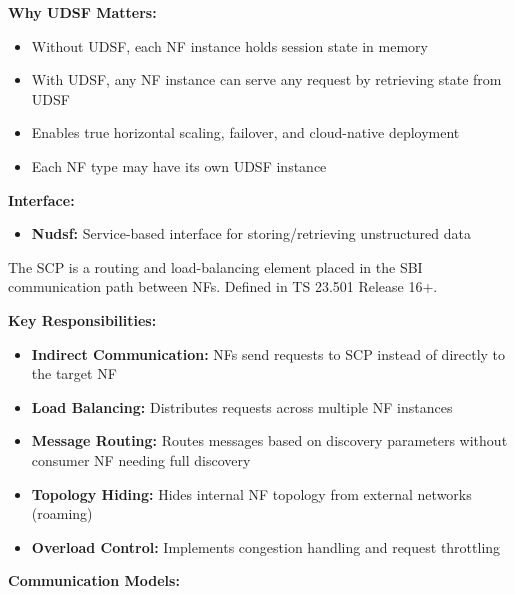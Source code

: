 \textbf{Why UDSF Matters:}

\begin{itemize}
\tightlist
\item
  Without UDSF, each NF instance holds session state in memory
\item
  With UDSF, any NF instance can serve any request by retrieving state from UDSF
\item
  Enables true horizontal scaling, failover, and cloud-native deployment
\item
  Each NF type may have its own UDSF instance
\end{itemize}

\textbf{Interface:}

\begin{itemize}
\tightlist
\item
  \textbf{Nudsf:} Service-based interface for storing/\allowbreak{}retrieving unstructured data
\end{itemize}


The SCP is a routing and load-balancing element placed in the SBI communication path between NFs. Defined in TS 23.501 Release 16+.

\textbf{Key Responsibilities:}

\begin{itemize}
\tightlist
\item
  \textbf{Indirect Communication:} NFs send requests to SCP instead of directly to the target NF
\item
  \textbf{Load Balancing:} Distributes requests across multiple NF instances
\item
  \textbf{Message Routing:} Routes messages based on discovery parameters without consumer NF needing full discovery
\item
  \textbf{Topology Hiding:} Hides internal NF topology from external networks (roaming)
\item
  \textbf{Overload Control:} Implements congestion handling and request throttling
\end{itemize}


\textbf{Communication Models:}

